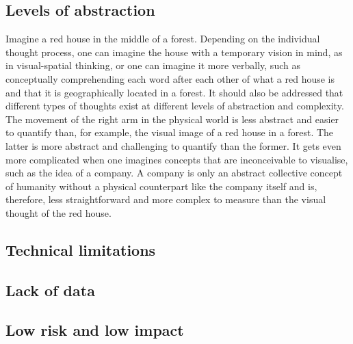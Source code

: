 \subsection{Levels of abstraction}
\label{chapter2-levels-of-abstraction}



Imagine a red house in the middle of a forest. Depending on the individual thought process, one can imagine the house with a temporary vision in mind, as in visual-spatial thinking, or one can imagine it more verbally, such as conceptually comprehending each word after each other of what a red house is and that it is geographically located in a forest. It should also be addressed that different types of thoughts exist at different levels of abstraction and complexity. The movement of the right arm in the physical world is less abstract and easier to quantify than, for example, the visual image of a red house in a forest. The latter is more abstract and challenging to quantify than the former. It gets even more complicated when one imagines concepts that are inconceivable to visualise, such as the idea of a company. A company is only an abstract collective concept of humanity without a physical counterpart like the company itself and is, therefore, less straightforward and more complex to measure than the visual thought of the red house.

\subsection{Technical limitations}
\label{chapter2-technical-limitations}

\subsection{Lack of data}
\label{chapter2-lack-of-data}

\subsection{Low risk and low impact}
\label{chapter2-low-risk-and-low-impact}





